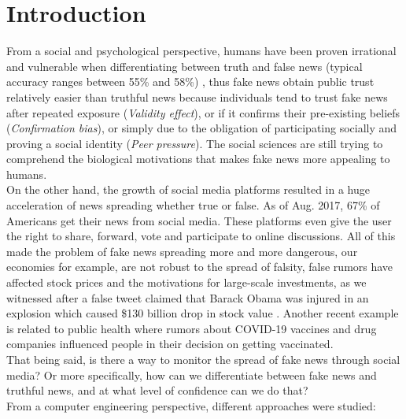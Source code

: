 \documentclass[conference]{IEEEtran}
\begin{document}
\section{Introduction}
From a social and psychological perspective, humans have been proven irrational and vulnerable when differentiating between truth and false news (typical accuracy ranges between 55\% and 58\%) \cite{zhou2019fake}, thus fake news obtain public trust relatively easier than truthful news because individuals tend to trust fake news after repeated exposure (\textit{Validity effect}), or if it confirms their pre-existing beliefs (\textit{Confirmation bias}), or simply due to the obligation of participating socially and proving a social identity (\textit{Peer pressure}). The social sciences are still trying to comprehend the biological motivations that makes fake news more appealing to humans.\\

On the other hand, the growth of social media platforms resulted in a huge acceleration of news spreading whether true or false. As of Aug. 2017, 67\% \cite{zhou2019fake} of Americans get their news from social media. These platforms even give the user the right to share, forward, vote and participate to online discussions. All of this made the problem of fake news spreading more and more dangerous, our economies for example, are not robust to the spread of falsity, false rumors have affected stock prices and the motivations for large-scale investments, as we witnessed after a false tweet claimed that Barack Obama was injured in an explosion which caused \$130 billion drop in stock value \cite{vosoughi2018spread}. Another recent example is related to public health where rumors about COVID-19 vaccines and drug companies influenced people in their decision on getting vaccinated.\\

That being said, is there a way to monitor the spread of fake news through social media? Or more specifically, how can we differentiate between fake news and truthful news, and at what level of confidence can we do that?\\

From a computer engineering perspective, different approaches were studied:
\end{document}
